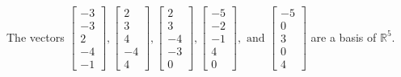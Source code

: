 \begin{exercise}
\begin{exerciseStatement}
  \end{exerciseStatement}
  \begin{exerciseAnswer}
   The vectors \(\left[\begin{array}{r}
-3 \\
-3 \\
2 \\
-4 \\
-1
\end{array}\right] , \left[\begin{array}{r}
2 \\
3 \\
4 \\
-4 \\
4
\end{array}\right] , \left[\begin{array}{r}
2 \\
3 \\
-4 \\
-3 \\
0
\end{array}\right] , \left[\begin{array}{r}
-5 \\
-2 \\
-1 \\
4 \\
0
\end{array}\right] , \text{ and } \left[\begin{array}{r}
-5 \\
0 \\
3 \\
0 \\
4
\end{array}\right]\) 
  	 are  a basis of \(\mathbb{R}^5\).
  


  \end{exerciseAnswer}
\end{exercise}